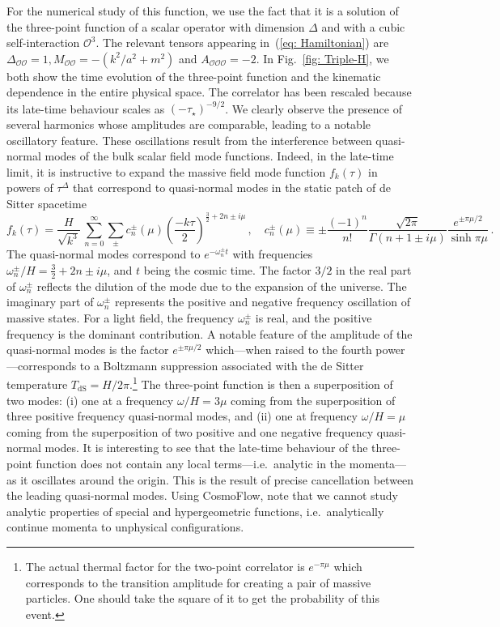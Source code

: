 \documentclass[11pt]{article}
\numberwithin{equation}{section} %
\def \O {\mathcal{O}}
\begin{document}
\vskip 4pt
For the numerical study of this function, we use the fact that it is a solution of the three-point function of a scalar operator with dimension $\Delta$ and with a cubic self-interaction $\O^3$. The relevant tensors appearing in~(\ref{eq: Hamiltonian}) are $\Delta_{\O\O} = 1, M_{\O\O} = -(k^2/a^2 + m^2)$ and $A_{\O\O\O} = -2$. In Fig.~\ref{fig: Triple-H}, we both show the time evolution of the three-point function and the kinematic dependence in the entire physical space. The correlator has been rescaled because its late-time behaviour scales as $(-\tau_\star)^{-9/2}$. We clearly observe the
presence of several harmonics whose amplitudes are comparable, leading to a notable oscillatory
feature. These oscillations result from the interference between quasi-normal modes of the bulk scalar field mode functions. Indeed, in the late-time limit, it is instructive to expand the massive field mode function $f_k(\tau)$ in powers of $\tau^\Delta$ that correspond to quasi-normal modes in the static patch of de Sitter spacetime~\cite{Du:2004jt, Jafferis:2013qia}
\begin{equation}
    f_k(\tau) = \frac{H}{\sqrt{k^3}}\,\sum_{n=0}^{\infty}\sum_{\pm} c_n^\pm(\mu) \left(\frac{-k\tau}{2}\right)^{\frac{3}{2}+2n\pm i\mu}\,, \quad c_n^{\pm}(\mu) \equiv \pm \frac{(-1)^n}{n!}\frac{\sqrt{2\pi}}{\Gamma(n+1\pm i\mu)}\frac{e^{\pm\pi\mu/2}}{\sinh\pi\mu}\,.
\end{equation}
The quasi-normal modes correspond to $e^{-\omega_n^\pm t}$ with frequencies $\omega_n^\pm/H = \frac{3}{2}+2n\pm i\mu$, and $t$ being the cosmic time. The factor $3/2$ in the real part of $\omega_n^\pm$ reflects the dilution of the mode due to the expansion of the universe. The imaginary part of $\omega_n^\pm$ represents the positive and negative frequency oscillation of massive states. For a light field, the frequency $\omega_n^\pm$ is real, and the positive frequency is the dominant contribution. A notable feature of the amplitude of the quasi-normal modes is the factor $e^{\pm\pi\mu/2}$ which---when raised to the fourth power---corresponds to a Boltzmann suppression associated with the de Sitter temperature $T_{\text{dS}}=H/2\pi$.\footnote{The actual thermal factor for the two-point correlator is $e^{-\pi\mu}$ which corresponds to the transition amplitude for creating a pair of massive particles. One should take the square of it to get the probability of this event.} The three-point function is then a superposition of two modes: (i) one at a frequency $\omega/H = 3\mu$ coming from the superposition of three positive frequency quasi-normal modes, and (ii) one at frequency $\omega/H = \mu$ coming from the superposition of two positive and one
negative frequency quasi-normal modes. It is interesting to see that the late-time behaviour of the three-point function does not contain any local terms---i.e.~analytic in the momenta---as it oscillates around the origin. This is the result of precise cancellation between the leading quasi-normal modes. Using \textsf{CosmoFlow}, note that we cannot study analytic properties of special and hypergeometric functions, i.e.~analytically continue momenta to unphysical configurations.
\end{document}
